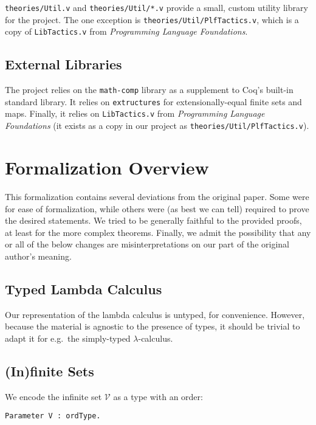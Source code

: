 \documentclass{article}
\begin{document}
\verb|theories/Util.v| and \verb|theories/Util/*.v| provide a small, custom utility library for the
project. The one exception is \verb|theories/Util/PlfTactics.v|, which is a copy of
\verb|LibTactics.v| from \emph{Programming Language Foundations}.

\subsection{External Libraries}

The project relies on the \verb|math-comp| library as a supplement to Coq's built-in standard
library. It relies on \verb|extructures| for extensionally-equal finite sets and maps. Finally, it
relies on \verb|LibTactics.v| from \emph{Programming Language Foundations} (it exists as a copy in our
project as \verb|theories/Util/PlfTactics.v|).

\section{Formalization Overview}

This formalization contains several deviations from the original paper. Some were for ease of
formalization, while others were (as best we can tell) required to prove the desired statements.
We tried to be generally faithful to the provided proofs, at least for the more complex theorems.
Finally, we admit the possibility that any or all of the below changes are
misinterpretations on our part of the original author's meaning.

\subsection{Typed Lambda Calculus}

Our representation of the lambda calculus is untyped, for convenience. However, because the material
is agnostic to the presence of types, it should be trivial to adapt it for e.g.\ the simply-typed
$\lambda$-calculus.

\subsection{(In)finite Sets}

We encode the infinite set $\mathcal{V}$ as a type with an order:

\begin{verbatim}
Parameter V : ordType.
\end{verbatim}
\end{document}
